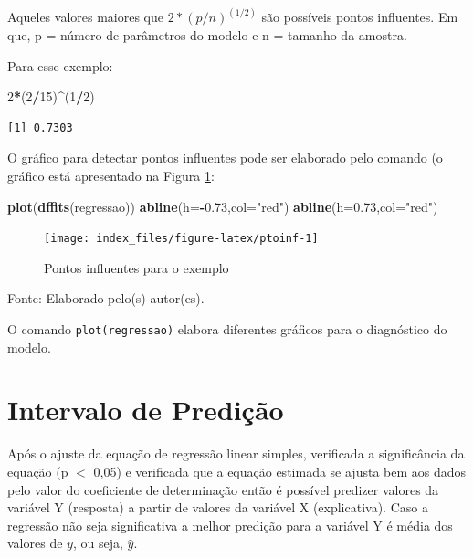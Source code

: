 \documentclass[12pt,brazil,oneside]{book}
\newenvironment{Shaded}{\begin{snugshade}}{\end{snugshade}}
\newcommand{\DataTypeTok}[1]{\textcolor[rgb]{0.13,0.29,0.53}{#1}}
\newcommand{\DecValTok}[1]{\textcolor[rgb]{0.00,0.00,0.81}{#1}}
\newcommand{\FloatTok}[1]{\textcolor[rgb]{0.00,0.00,0.81}{#1}}
\newcommand{\KeywordTok}[1]{\textcolor[rgb]{0.13,0.29,0.53}{\textbf{#1}}}
\newcommand{\NormalTok}[1]{#1}
\newcommand{\OperatorTok}[1]{\textcolor[rgb]{0.81,0.36,0.00}{\textbf{#1}}}
\newcommand{\StringTok}[1]{\textcolor[rgb]{0.31,0.60,0.02}{#1}}
\begin{document}
Aqueles valores maiores que \(2*(p/n)^{(1/2)}\) são possíveis pontos influentes. Em que, p = número de parâmetros do modelo e n = tamanho da amostra.

Para esse exemplo:

\begin{Shaded}
\begin{Highlighting}[]
\DecValTok{2}\OperatorTok{*}\NormalTok{(}\DecValTok{2}\OperatorTok{/}\DecValTok{15}\NormalTok{)}\OperatorTok{^}\NormalTok{(}\DecValTok{1}\OperatorTok{/}\DecValTok{2}\NormalTok{)}
\end{Highlighting}
\end{Shaded}

\begin{verbatim}
[1] 0.7303
\end{verbatim}

O gráfico para detectar pontos influentes pode ser elaborado pelo comando (o gráfico está apresentado na Figura \ref{fig:ptoinf}:

\begin{Shaded}
\begin{Highlighting}[]
\KeywordTok{plot}\NormalTok{(}\KeywordTok{dffits}\NormalTok{(regressao))}
\KeywordTok{abline}\NormalTok{(}\DataTypeTok{h=}\OperatorTok{-}\FloatTok{0.73}\NormalTok{,}\DataTypeTok{col=}\StringTok{"red"}\NormalTok{)}
\KeywordTok{abline}\NormalTok{(}\DataTypeTok{h=}\FloatTok{0.73}\NormalTok{,}\DataTypeTok{col=}\StringTok{"red"}\NormalTok{)}
\end{Highlighting}
\end{Shaded}

\begin{figure}[H]

{\centering \texttt{[image: index\_files/figure-latex/ptoinf-1]} 

}

\caption{Pontos influentes para o exemplo}\label{fig:ptoinf}
\end{figure}

Fonte: Elaborado pelo(s) autor(es).

O comando \texttt{plot(regressao)} elabora diferentes gráficos para o diagnóstico do modelo.

\hypertarget{intervalo-de-predicao}{%
\section{Intervalo de Predição}\label{intervalo-de-predicao}}

Após o ajuste da equação de regressão linear simples, verificada a significância da equação (p \(<\) 0,05) e verificada que a equação estimada se ajusta bem aos dados pelo valor do coeficiente de determinação então é possível predizer valores da variável Y (resposta) a partir de valores da variável X (explicativa). Caso a regressão não seja significativa a melhor predição para a variável Y é média dos valores de \(y\), ou seja, \(\hat{y}\).
\end{document}
